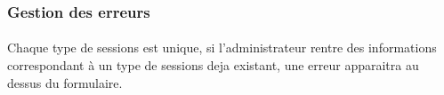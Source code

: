 \subsubsection{Gestion des erreurs}
	\paragraph{}
		Chaque type de sessions est unique, si l'administrateur rentre des informations correspondant à un type de sessions deja existant, une erreur apparaitra au dessus du formulaire.